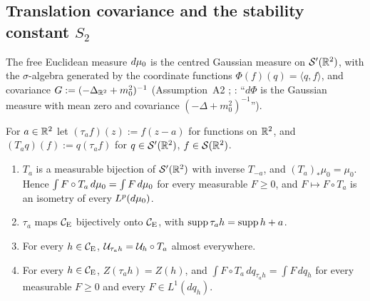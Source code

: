 \subsection{Translation covariance and the stability constant $S_2$}\label{sec:notation-S2}

The free Euclidean measure $d\mu_0$ is the centred Gaussian measure on $\mathcal
S'(\mathbb{R}^2)$, with the $\sigma$-algebra generated by the coordinate functions
$\Phi(f)(q)=\langle q,f\rangle$, and covariance $G:=(-\Delta_{\mathbb{R}^2}+m_0^2)^{-1}$
(Assumption~A2 \cite[p.~8]{R}; \cite[p.~589]{GJS}: ``$d\Phi$ is the Gaussian measure with mean
zero and covariance $(-\Delta+m_0^2)^{-1}$'').

\begin{auxlemma}\label{aux:notation-transl}
For $a\in\mathbb{R}^2$ let $(\tau_af)(z):=f(z-a)$ for functions on $\mathbb{R}^2$, and $(T_aq)(f):=q(\tau_af)$
for $q\in\mathcal S'(\mathbb{R}^2)$, $f\in\mathcal S(\mathbb{R}^2)$.
\begin{enumerate}
\item[\textup{(i)}] $T_a$ is a measurable bijection of $\mathcal S'(\mathbb{R}^2)$ with inverse
$T_{-a}$, and $(T_a)_*\mu_0=\mu_0$.  Hence $\int F\circ T_a\,d\mu_0=\int F\,d\mu_0$ for every
measurable $F\ge0$, and $F\mapsto F\circ T_a$ is an isometry of every $L^p(d\mu_0)$.
\item[\textup{(ii)}] $\tau_a$ maps $\mathcal{C}_{\mathrm E}$ bijectively onto $\mathcal{C}_{\mathrm E}$, with $\operatorname{supp}\tau_ah=\operatorname{supp}
h+a$.
\item[\textup{(iii)}] For every $h\in\mathcal{C}_{\mathrm E}$, $\mathcal U_{\tau_ah}=\mathcal U_h\circ T_a$ almost everywhere.
\item[\textup{(iv)}] For every $h\in\mathcal{C}_{\mathrm E}$, $Z(\tau_ah)=Z(h)$, and $\int F\circ T_a\,dq_{\tau_ah}=
\int F\,dq_h$ for every measurable $F\ge0$ and every $F\in L^1(dq_h)$.
\end{enumerate}
\end{auxlemma}

